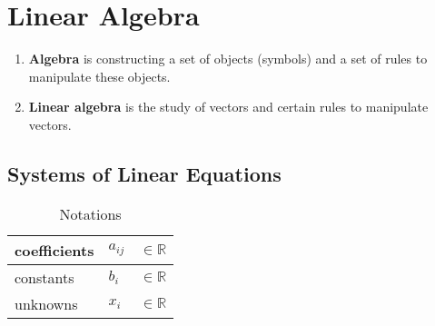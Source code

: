 \chapter{Linear Algebra}

\begin{enumerate}
    \item \textbf{Algebra} is constructing a set of objects (symbols) and a set of rules to manipulate these objects.
    \hfill \cite{mfml/book/mml/Deisenroth-Faisal-Ong}

    \item \textbf{Linear algebra} is the study of vectors and certain rules to manipulate vectors.
    \hfill \cite{mfml/book/mml/Deisenroth-Faisal-Ong}
\end{enumerate}


\section{Systems of Linear Equations}

\begin{customArrayStretch}{1.3}
\begin{table}[H]
    \centering
    \begin{tabular}{| l | l  l |}
        \hline
        
        coefficients & $a_{ij}$    & $\in \mathbb{R}$ \\ \hline
        
        constants & $b_{i}$     & $\in \mathbb{R}$ \\ \hline

        unknowns & $x_{i}$     & $\in \mathbb{R}$ \\ \hline

    \end{tabular}
    \caption*{Notations}
\end{table}
\end{customArrayStretch}


\vspace{0.5cm}


